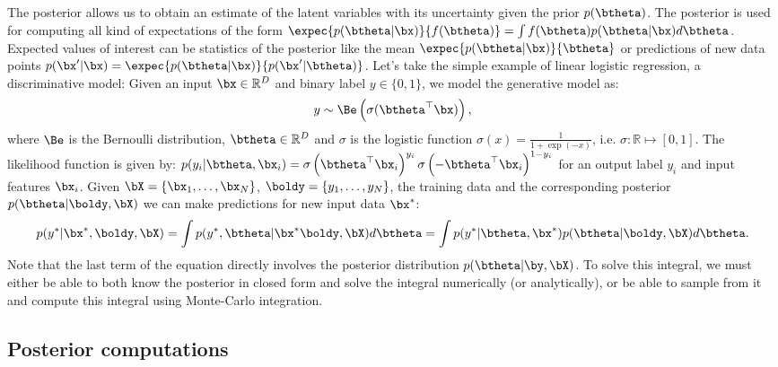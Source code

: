 The posterior allows us to obtain an estimate of the latent variables with its uncertainty given the prior $p(\btheta)$.
The posterior is used for computing all kind of expectations of the form $\expec{p(\btheta|\bx)}{f(\btheta)} = \int f(\btheta)p(\btheta|\bx)d\btheta$.
Expected values of interest can be statistics of the posterior like the mean $\expec{p(\btheta|\bx)}{\btheta}$ or predictions of new data points $p(\bx'|\bx) = \expec{p(\btheta|\bx)}{p(\bx'|\btheta)}$.
Let's take the simple example of linear logistic regression, a discriminative model:
Given an input $\bx \in \mathbb{R}^D$ and binary label $y\in \{ 0, 1\}$, we model the generative model as:
\begin{align}
y \sim \Be\left(\sigma(\btheta^\top \bx)\right),
\end{align}
where $\Be$ is the Bernoulli distribution, $\btheta\in\mathbb{R}^D$ and $\sigma$ is the logistic function $\sigma(x) = \frac{1}{1 + \exp(-x)}$, i.e. $\sigma : \mathbb{R} \mapsto [0, 1]$.
The likelihood function is given by: $p(y_i|\btheta,\bx_i) =\sigma\left(\btheta^\top \bx_i\right)^{y_i}\sigma\left(-\btheta^\top \bx_i\right)^{1-y_i}$ for an output label $y_i$ and input features $\bx_i$.
Given $\bX = \{\bx_1,\ldots,\bx_N\}$, $\boldy = \{y_1,\ldots,y_N\}$, the training data and the corresponding posterior $p(\btheta|\boldy, \bX)$ we can make predictions for new input data $\bx^*$:
\begin{align}
p(y^*|\bx^*,\boldy,\bX) = \int p(y^*, \btheta|\bx^*\boldy, \bX)d\btheta = \int p(y^*|\btheta,\bx^*) p(\btheta|\boldy,\bX)d\btheta.
\end{align}
Note that the last term of the equation directly involves the posterior distribution $p(\btheta|\by,\bX)$.
To solve this integral, we must either be able to both know the posterior in closed form and solve the integral numerically (or analytically), or be able to sample from it and compute this integral using Monte-Carlo integration.

\subsection{Posterior computations}

